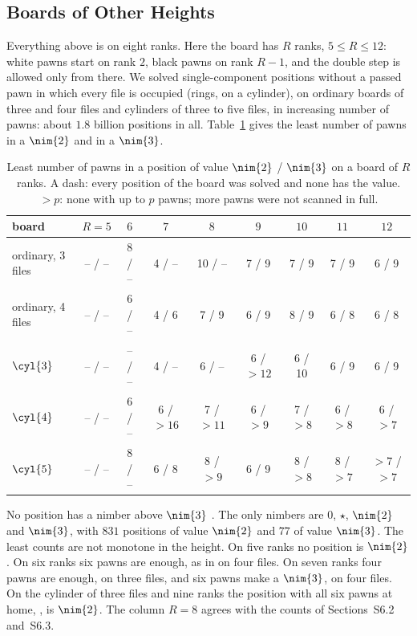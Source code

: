 \subsection{Boards of Other Heights}\label{S-heights}
Everything above is on eight ranks. Here the board has $R$ ranks, $5\le R\le12$: white pawns start on rank $2$,
black pawns on rank $R-1$, and the double step is allowed only from there. We solved single-component positions
without a passed pawn in which every file is occupied (rings, on a cylinder), on ordinary boards of three and four
files and cylinders of three to five files, in increasing number of pawns: about $1.8$ billion positions in all.
Table~\ref{tab:heights} gives the least number of pawns in a $\nim{2}$ and in a $\nim{3}$.

\begin{table}[!htbp]
\centering
\caption{Least number of pawns in a position of value $\nim{2}$ / $\nim{3}$ on a board of $R$ ranks. A dash: every
position of the board was solved and none has the value. ${>}p$: none with up to $p$ pawns; more pawns were not
scanned in full.}
\label{tab:heights}
\small
\begin{tabular}{@{}lcccccccc@{}}
\toprule
board & $R=5$ & $6$ & $7$ & $8$ & $9$ & $10$ & $11$ & $12$\\
\midrule
ordinary, 3 files & -- / -- & 8 / -- & 4 / -- & 10 / -- & 7 / 9 & 7 / 9 & 7 / 9 & 6 / 9\\
ordinary, 4 files & -- / -- & 6 / -- & 4 / 6 & 7 / 9 & 6 / 9 & 8 / 9 & 6 / 8 & 6 / 8\\
$\cyl{3}$ & -- / -- & -- / -- & 4 / -- & 6 / -- & 6 / ${>}12$ & 6 / 10 & 6 / 9 & 6 / 9\\
$\cyl{4}$ & -- / -- & 6 / -- & 6 / ${>}16$ & 7 / ${>}11$ & 6 / ${>}9$ & 7 / ${>}8$ & 6 / ${>}8$ & 6 / ${>}7$\\
$\cyl{5}$ & -- / -- & 8 / -- & 6 / 8 & 8 / ${>}9$ & 6 / 9 & 8 / ${>}8$ & 8 / ${>}7$ & ${>}7$ / ${>}7$\\
\bottomrule
\end{tabular}
\end{table}

No position has a nimber above $\nim{3}$ . The only nimbers are $0$, $\star$, $\nim{2}$ and $\nim{3}$, with
$831$ positions of value $\nim{2}$ and $77$ of value $\nim{3}$. The least counts are not monotone in the height.
On five ranks no position is $\nim{2}$. On six ranks six pawns are enough, as in  on
four files. On seven ranks four pawns are enough,  on three files, and six pawns make a
$\nim{3}$,  on four files. On the cylinder of three files and nine ranks the position
with all six pawns at home, , is $\nim{2}$. The column $R=8$ agrees with the counts of
Sections~S6.2 and~S6.3.

